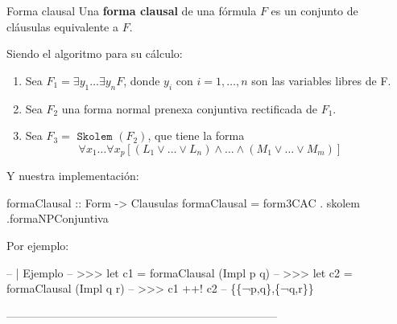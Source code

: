 \documentclass[final]{beamer}
\newlength{\sepwid}
\newlength{\onecolwid}
\begin{document}
\begin{frame}[t,fragile] %

\begin{columns}[t] %

\begin{column}{\sepwid}\end{column} %

\begin{column}{\onecolwid} %


\begin{block}{Forma clausal}
 Una \textbf{forma clausal} de una fórmula $F$ es un conjunto de cláusulas
 equivalente a $F$.

 Siendo el algoritmo para su cálculo:
 \begin{enumerate}
\item Sea $F_1 = \exists y_1 \dots \exists y_n F$, donde $y_i$ con
  $i=1,\dots ,n$ son las variables libres de F.
\item Sea $F_2$ una forma normal prenexa conjuntiva rectificada de $F_1$.
\item Sea $F_3= \texttt{ Skolem }(F_2)$, que tiene la forma
  $$\forall x_1 \dots \forall x_p [(L_1\vee \dots \vee L_n)
  \wedge \dots \wedge (M_1\vee \dots \vee M_m)]$$
\end{enumerate}

Y nuestra implementación:

\begin{code}
formaClausal :: Form -> Clausulas
formaClausal  = form3CAC . skolem .formaNPConjuntiva
\end{code}

Por ejemplo:

\begin{sesion}
-- | Ejemplo
-- >>> let c1 = formaClausal (Impl p q)
-- >>> let c2 = formaClausal (Impl q r)
-- >>> c1 ++! c2
-- \{\{¬p,q\},\{¬q,r\}\}
\end{sesion}
\end{block}

 
------------------------------------------------------------------------



\end{column}
\end{columns}
\end{frame}
\end{document}
